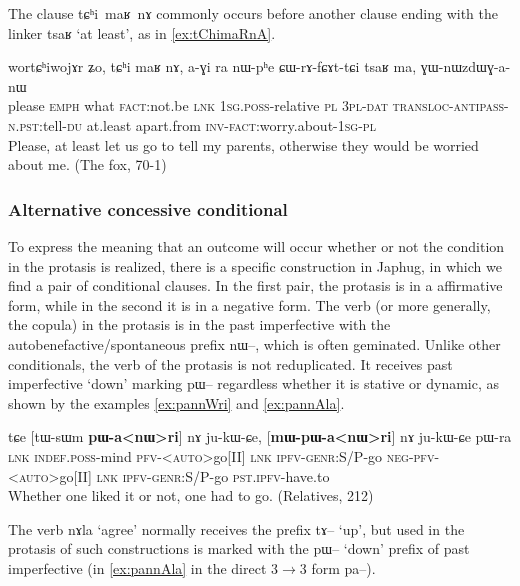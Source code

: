 \documentclass[oldfontcommands,oneside,a4paper,11pt]{article}
\newcommand{\ipa}[1]{{\phon \mbox{#1}}} %
\begin{document}
The clause \ipa{tɕʰi maʁ nɤ} commonly occurs before another clause ending with the linker \ipa{tsaʁ} `at least', as in \ref{ex:tChimaRnA}.
\begin{exe}
\ex  \label{ex:tChimaRnA}
\gll
\ipa{wortɕʰiwojɤr} 	\ipa{ʑo,} 	\ipa{tɕʰi} 	\ipa{maʁ} 	\ipa{nɤ,} 	\ipa{a-ɣi} 	\ipa{ra} 	\ipa{nɯ-pʰe} 	\ipa{ɕɯ-rɤ-fɕɤt-tɕi} 	\ipa{tsaʁ} 	\ipa{ma,} 	\ipa{ɣɯ-nɯzdɯɣ-a-nɯ} 	 \\
please \textsc{emph} what \textsc{fact}:not.be \textsc{lnk} \textsc{1sg.poss}-relative \textsc{pl} \textsc{3pl-dat} \textsc{transloc-antipass-n.pst}:tell-\textsc{du} at.least  apart.from \textsc{inv}-\textsc{fact}:worry.about-\textsc{1sg-pl} \\
\glt Please, at least let us go to tell my parents, otherwise they would be worried about me. (The fox, 70-1)

\end{exe}
\subsubsection{Alternative concessive conditional}
To express the meaning that an outcome will occur whether or not the condition in the protasis is realized, there is a specific construction in Japhug, in which we find a pair of conditional clauses. In the first pair, the protasis is in a affirmative form, while in the second it is in a negative form. The verb (or more generally, the copula) in the protasis  is in the past imperfective with the autobenefactive/spontaneous prefix \ipa{nɯ--}, which is often geminated. Unlike other conditionals, the verb of the protasis is not reduplicated. It receives past imperfective `down' marking \ipa{pɯ}-- regardless whether it is stative or dynamic, as shown by the examples \ref{ex:pannWri} and \ref{ex:pannAla}.


\begin{exe}
\ex  \label{ex:pannWri}
\gll
\ipa{tɕe}  	[\ipa{tɯ-sɯm}  	\textbf{\ipa{pɯ-a<nɯ>ri}}]  	\ipa{nɤ}  	\ipa{ju-kɯ-ɕe,}  	[\textbf{\ipa{mɯ-pɯ-a<nɯ>ri}}]  	\ipa{nɤ}  	\ipa{ju-kɯ-ɕe}  	\ipa{pɯ-ra}  \\
\textsc{lnk} \textsc{indef.poss}-mind  \textsc{pfv-<auto>}go[II] \textsc{lnk} \textsc{ipfv-genr}:S/P-go \textsc{neg-pfv-<auto>}go[II] \textsc{lnk} \textsc{ipfv-genr}:S/P-go \textsc{pst.ipfv}-have.to \\
\glt Whether one liked it or not, one had to go. (Relatives, 212)
\end{exe}

The verb \ipa{nɤla} `agree' normally receives the prefix \ipa{tɤ}-- `up', but used in the protasis of such constructions is marked with the \ipa{pɯ}-- `down' prefix of past imperfective (in \ref{ex:pannAla} in the direct 3$\rightarrow$3 form \ipa{pa}--).
\end{document}
